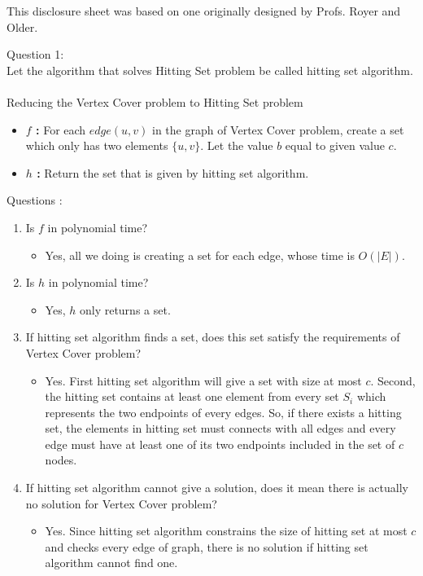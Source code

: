 \documentclass[12pt]{article}
\begin{document}

\hfill {\tiny This disclosure sheet was based on one originally designed
  by
  Profs. Royer and Older.}


\pagebreak
\noindent
\large Question 1: \vspace{5mm} \\
\normalsize
Let the algorithm that solves Hitting Set problem be called hitting set algorithm.
\\
\\
\noindent
Reducing the Vertex Cover problem to Hitting Set problem
\begin{itemize}
  \item \textbf{$f$ :}  For each $edge(u, v)$ in the graph of Vertex Cover problem, create a set which only has two elements $\{u, v\}$. 
		     Let the value $b$ equal to given value $c$. 
  \item	\textbf{$h$ :} Return the set that is given by hitting set algorithm.
\end{itemize}

 Questions :
\begin{enumerate}
  \item Is \textbf{$f$} in polynomial time? 
	\begin{itemize}
	  \item Yes, all we doing is creating a set for each edge, whose time is $O(|E|)$. 
	\end{itemize}
  \item	Is \textbf{$h$} in polynomial time? 
	\begin{itemize}
	  \item Yes, $h$ only returns a set.  
	\end{itemize}
  \item If hitting set algorithm finds a set, does this set satisfy the requirements of Vertex Cover problem? 
	\begin{itemize}
	  \item Yes. First hitting set algorithm will give a set with size at most $c$. 
		Second, the hitting set contains at least one element from every set $S_i$ which represents the two endpoints of every edges. 
		So, if there exists a hitting set, 
		the elements in hitting set must connects with all edges and every edge must have at least one of its two endpoints included in the set of $c$ nodes.
	\end{itemize}
  \item If hitting set algorithm cannot give a solution, does it mean there is actually no solution for Vertex Cover problem? 
	\begin{itemize}
	  \item Yes. 
		Since hitting set algorithm constrains the size of hitting set at most $c$ and checks every edge of graph,
		there is no solution if hitting set algorithm cannot find one.
	\end{itemize}
\end{enumerate}
\end{document}
